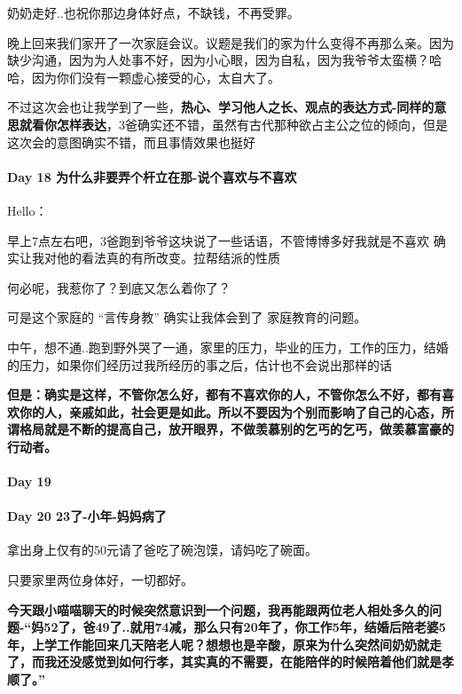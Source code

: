 \documentclass[UTF8,a4paper,8pt]{ctexart}
\begin{document}
	     奶奶走好..也祝你那边身体好点，不缺钱，不再受罪。
	     
	     晚上回来我们家开了一次家庭会议。议题是我们的家为什么变得不再那么亲。因为缺少沟通，因为为人处事不好，因为小心眼，因为自私，因为我爷爷太蛮横？哈哈，因为你们没有一颗虚心接受的心，太自大了。
	     
	     不过这次会也让我学到了一些，\textbf{热心、学习他人之长、观点的表达方式-同样的意思就看你怎样表达}，3爸确实还不错，虽然有古代那种欲占主公之位的倾向，但是这次会的意图确实不错，而且事情效果也挺好
     \paragraph{Day 18   为什么非要弄个杆立在那-说个喜欢与不喜欢  \quad     }Hello：
     
	     早上7点左右吧，3爸跑到爷爷这块说了一些话语，不管博博多好我就是不喜欢 确实让我对他的看法真的有所改变。拉帮结派的性质
	     
	     何必呢，我惹你了？到底又怎么着你了？
	     
	     可是这个家庭的 “言传身教” 确实让我体会到了 家庭教育的问题。
	     
	     中午，想不通..跑到野外哭了一通，家里的压力，毕业的压力，工作的压力，结婚的压力，如果你们经历过我所经历的事之后，估计也不会说出那样的话
	     
	     \textbf{但是：确实是这样，不管你怎么好，都有不喜欢你的人，不管你怎么不好，都有喜欢你的人，亲戚如此，社会更是如此。所以不要因为个别而影响了自己的心态，所谓格局就是不断的提高自己，放开眼界，不做羡慕别的乞丐的乞丐，做羡慕富豪的行动者。}
     \paragraph{Day 19      \quad     }
     \paragraph{Day 20   23了-小年-妈妈病了    \quad     }
     
	     拿出身上仅有的50元请了爸吃了碗泡馍，请妈吃了碗面。
 
		 只要家里两位身体好，一切都好。
		 
		 \textbf{今天跟小喵喵聊天的时候突然意识到一个问题，我再能跟两位老人相处多久的问题-“妈52了，爸49了..就用74减，那么只有20年了，你工作5年，结婚后陪老婆5年，上学工作能回来几天陪老人呢？想想也是辛酸，原来为什么突然间奶奶就走了，而我还没感觉到如何行孝，其实真的不需要，在能陪伴的时候陪着他们就是孝顺了。”}
\end{document}
